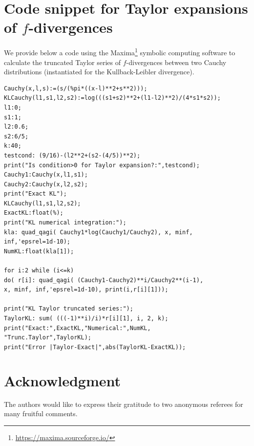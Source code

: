 \documentclass[journal]{IEEEtran}
\begin{document}
 

\section{Code snippet for Taylor expansions of $f$-divergences}\label{sec:maximataylor}
We provide below a code using the {\sc Maxima}\footnote{\url{https://maxima.sourceforge.io/}} symbolic computing software to calculate the truncated Taylor series of $f$-divergences between two Cauchy distributions (instantiated for the Kullback-Leibler divergence).

{\scriptsize
\begin{verbatim}
Cauchy(x,l,s):=(s/(%pi*((x-l)**2+s**2)));
KLCauchy(l1,s1,l2,s2):=log(((s1+s2)**2+(l1-l2)**2)/(4*s1*s2));
l1:0;
s1:1;
l2:0.6;
s2:6/5;
k:40;
testcond: (9/16)-(l2**2+(s2-(4/5))**2);
print("Is condition>0 for Taylor expansion?:",testcond);
Cauchy1:Cauchy(x,l1,s1);
Cauchy2:Cauchy(x,l2,s2);
print("Exact KL");
KLCauchy(l1,s1,l2,s2);
ExactKL:float(%);
print("KL numerical integration:");
kla: quad_qagi( Cauchy1*log(Cauchy1/Cauchy2), x, minf, 
inf,'epsrel=1d-10); 
NumKL:float(kla[1]);

for i:2 while (i<=k)  
do( r[i]: quad_qagi( (Cauchy1-Cauchy2)**i/Cauchy2**(i-1), 
x, minf, inf,'epsrel=1d-10), print(i,r[i][1]));

print("KL Taylor truncated series:");
TaylorKL: sum( (((-1)**i)/i)*r[i][1], i, 2, k);
print("Exact:",ExactKL,"Numerical:",NumKL,
"Trunc.Taylor",TaylorKL);
print("Error |Taylor-Exact|",abs(TaylorKL-ExactKL));
\end{verbatim}
}




\section*{Acknowledgment}


The authors would like to express their gratitude to two anonymous referees for many fruitful comments.  


\ifCLASSOPTIONcaptionsoff
  \newpage
\fi
\end{document}
